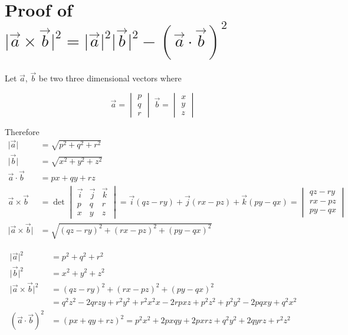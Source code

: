 \section{Proof of 
$\lvert\vec{a}\times\vec{b}\rvert^2 = 
\lvert\vec{a}\rvert^2
\lvert\vec{b}\rvert^2
- (\vec{a}\cdot\vec{b})^2
$
}

Let $\vec{a}$, $\vec{b}$ be two three dimensional vectors where

\[
    \vec{a} = \begin{vmatrix}
        p \\ q \\ r
    \end{vmatrix} \;
    \vec{b} = \begin{vmatrix}
        x \\ y \\ z
    \end{vmatrix}
\]

Therefore
\[
\begin{aligned}
    \lvert\vec{a}\rvert & = \sqrt{p^2 + q^2 + r^2} \\
    \lvert\vec{b}\rvert & = \sqrt{x^2 + y^2 + z^2} \\
    \vec{a}\cdot\vec{b} & = px + qy + rz \\
    \vec{a}\times\vec{b} & = \det\begin{vmatrix}
        \vec{i} & \vec{j} & \vec{k} \\
        p & q & r \\
        x & y & z
    \end{vmatrix} = \vec{i}(qz - ry) + \vec{j}(rx - pz) + \vec{k}(py - qx) = \begin{vmatrix}
        qz - ry \\
        rx - pz \\
        py - qx 
    \end{vmatrix} \\
    \lvert\vec{a}\times\vec{b}\lvert & = \sqrt{(qz - ry)^2  + (rx - pz)^2 + (py - qx)^2}
\end{aligned}
\]

\[
\begin{aligned}
    \lvert\vec{a}\rvert^2 & = {p^2 + q^2 + r^2} \\
    \lvert\vec{b}\rvert^2 & = {x^2 + y^2 + z^2} \\
    \lvert\vec{a}\times\vec{b}\lvert^2 & = {(qz - ry)^2  + (rx - pz)^2 + (py - qx)^2} \\
    & = q^2z^2 -2qrzy + r^2y^2 + r^2x^2x - 2rpxz + p^2z^2 + p^2y^2 - 2pqxy + q^2x^2 \\
    (\vec{a}\cdot\vec{b})^2 & = (px + qy + rz)^2 = p^2x^2 + 2pxqy + 2pxrz + q^2y^2 + 2qyrz + r^2z^2
\end{aligned}
\]

